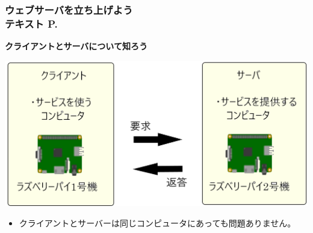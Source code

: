 \begin{frame}[fragile]
	\frametitle{ウェブサーバを立ち上げよう\\テキスト P.\pageref{1:P:HP}~~~}
    \textbf{クライアントとサーバについて知ろう}\\
			\begin{minipage}{\textwidth}
                {\upshape
                  \includegraphics[width=\textwidth]{./slide07-img/slide07-img014.png}}
            \end{minipage}
            \begin{itemize}\small
                \item クライアントとサーバーは同じコンピュータにあっても問題ありません。
            \end{itemize}
\end{frame}

